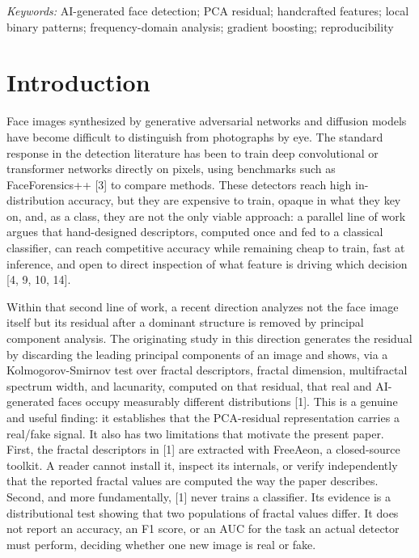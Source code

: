 \documentclass[11pt]{article}
\begin{document}
\vspace{0.5em}
\noindent\textit{Keywords:} AI-generated face detection; PCA residual; handcrafted features; local binary patterns; frequency-domain analysis; gradient boosting; reproducibility

\section{Introduction}

Face images synthesized by generative adversarial networks and diffusion models have become difficult to distinguish from photographs by eye. The standard response in the detection literature has been to train deep convolutional or transformer networks directly on pixels, using benchmarks such as FaceForensics++ [3] to compare methods. These detectors reach high in-distribution accuracy, but they are expensive to train, opaque in what they key on, and, as a class, they are not the only viable approach: a parallel line of work argues that hand-designed descriptors, computed once and fed to a classical classifier, can reach competitive accuracy while remaining cheap to train, fast at inference, and open to direct inspection of what feature is driving which decision [4, 9, 10, 14].

Within that second line of work, a recent direction analyzes not the face image itself but its residual after a dominant structure is removed by principal component analysis. The originating study in this direction generates the residual by discarding the leading principal components of an image and shows, via a Kolmogorov-Smirnov test over fractal descriptors, fractal dimension, multifractal spectrum width, and lacunarity, computed on that residual, that real and AI-generated faces occupy measurably different distributions [1]. This is a genuine and useful finding: it establishes that the PCA-residual representation carries a real/fake signal. It also has two limitations that motivate the present paper. First, the fractal descriptors in [1] are extracted with FreeAeon, a closed-source toolkit. A reader cannot install it, inspect its internals, or verify independently that the reported fractal values are computed the way the paper describes. Second, and more fundamentally, [1] never trains a classifier. Its evidence is a distributional test showing that two populations of fractal values differ. It does not report an accuracy, an F1 score, or an AUC for the task an actual detector must perform, deciding whether one new image is real or fake.
\end{document}
